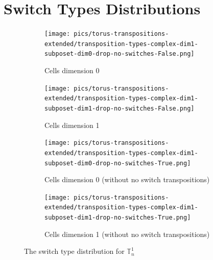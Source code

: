 \documentclass{article}
\begin{document}
\section{Switch Types Distributions}
\begin{figure}[htbp]
\centering
\begin{subfigure}[b]{0.45\textwidth}
    \texttt{[image: pics/torus-transpositions-extended/transposition-types-complex-dim1-subposet-dim0-drop-no-switches-False.png]}
    \caption{Cells dimension 0}
    \label{fig:complex1cells0}
\end{subfigure}
\hfill
\begin{subfigure}[b]{0.45\textwidth}
    \texttt{[image: pics/torus-transpositions-extended/transposition-types-complex-dim1-subposet-dim1-drop-no-switches-False.png]}
    \caption{Cells dimension 1}
    \label{fig:complex1cells1}
\end{subfigure}
\vspace{0.5cm}
\begin{subfigure}[b]{0.45\textwidth}
    \texttt{[image: pics/torus-transpositions-extended/transposition-types-complex-dim1-subposet-dim0-drop-no-switches-True.png]}
    \caption{Cells dimension 0 (without no switch transpositions)}
    \label{fig:complex1cells0onlyswitch}
\end{subfigure}
\hfill
\begin{subfigure}[b]{0.45\textwidth}
    \texttt{[image: pics/torus-transpositions-extended/transposition-types-complex-dim1-subposet-dim1-drop-no-switches-True.png]}
    \caption{Cells dimension 1 (without no switch transpositions)}
    \label{fig:complex1cells1onlyswitch}
\end{subfigure}
\caption{The switch type distribution for $\mathbb{T}_n^{1}$}
\label{typesdistribution1}
\end{figure}
\end{document}
